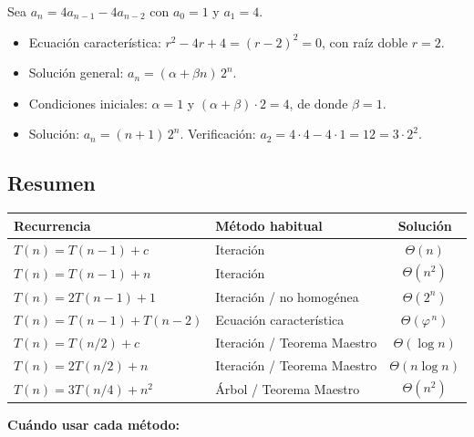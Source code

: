 \documentclass{article}
\begin{document}
        Sea $a_n = 4a_{n-1} - 4a_{n-2}$ con $a_0 = 1$ y $a_1 = 4$.
        
        \begin{itemize}
        \item Ecuación característica: $r^2 - 4r + 4 = (r-2)^2 = 0$, con raíz doble
                $r = 2$.
        \item Solución general: $a_n = (\alpha + \beta n)\,2^n$.
        \item Condiciones iniciales: $\alpha = 1$ y $(\alpha + \beta)\cdot 2 = 4$, de
                donde $\beta = 1$.
        \item Solución: $a_n = (n+1)\,2^n$. Verificación: $a_2 = 4\cdot 4 - 4\cdot 1 = 12 = 3\cdot 2^2$.
        \end{itemize}
        
        \subsection{Resumen}
        
        \begin{center}
        \small
        \renewcommand{\arraystretch}{1.5}
        \begin{tabular}{|l|l|c|}
        \hline
        \textbf{Recurrencia} & \textbf{Método habitual} & \textbf{Solución} \\
        \hline
        $T(n) = T(n-1) + c$ & Iteración & $\Theta(n)$ \\
        \hline
        $T(n) = T(n-1) + n$ & Iteración & $\Theta(n^2)$ \\
        \hline
        $T(n) = 2T(n-1) + 1$ & Iteración / no homogénea & $\Theta(2^n)$ \\
        \hline
        $T(n) = T(n-1) + T(n-2)$ & Ecuación característica & $\Theta(\varphi^{\,n})$ \\
        \hline
        $T(n) = T(n/2) + c$ & Iteración / Teorema Maestro & $\Theta(\log n)$ \\
        \hline
        $T(n) = 2T(n/2) + n$ & Iteración / Teorema Maestro & $\Theta(n\log n)$ \\
        \hline
        $T(n) = 3T(n/4) + n^2$ & Árbol / Teorema Maestro & $\Theta(n^2)$ \\
        \hline
        \end{tabular}
        \end{center}
        
        \textbf{Cuándo usar cada método:}
        
\end{document}
